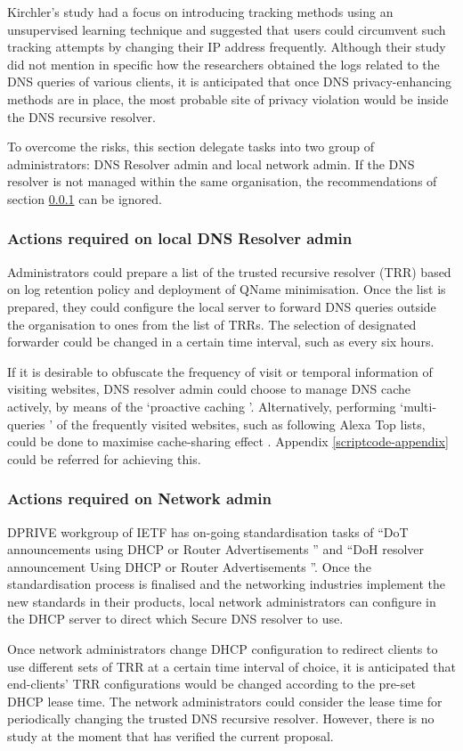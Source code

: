 Kirchler's study had a focus on introducing tracking methods using an unsupervised learning technique and suggested that users could circumvent such tracking attempts by changing their IP address frequently.
Although their study did not mention in specific how the researchers obtained the logs related to the DNS queries of various clients, it is anticipated that once DNS privacy-enhancing methods are in place, the most probable site of privacy violation would be inside the DNS recursive resolver.

To overcome the risks, this section delegate tasks into two group of administrators: DNS Resolver admin and local network admin.
If the DNS resolver is not managed within the same organisation, the recommendations of section \ref{dnsresolveradmin} can be ignored.

\subsubsection{Actions required on local DNS Resolver admin}\label{dnsresolveradmin}
Administrators could prepare a list of the trusted recursive resolver (TRR) based on log retention policy and deployment of QName minimisation.
Once the list is prepared, they could configure the local server to forward DNS queries outside the organisation to ones from the list of TRRs.
The selection of designated forwarder could be changed in a certain time interval, such as every six hours.

If it is desirable to obfuscate the frequency of visit or temporal information of visiting websites, DNS resolver admin could choose to manage DNS cache actively, by means of the `proactive caching \cite{cohen2003proactive}'. Alternatively, performing `multi-queries \cite{siby2018dns}' of the frequently visited websites, such as following Alexa Top lists, could be done to maximise cache-sharing effect \cite{wang2013analysis}. Appendix \ref{scriptcode-appendix} could be referred for achieving this.

\subsubsection{Actions required on Network admin}
DPRIVE workgroup of IETF has on-going standardisation tasks of ``DoT announcements using DHCP or Router Advertisements \cite{peterson-dot-dhcp-00}'' and ``DoH resolver announcement Using DHCP or Router Advertisements \cite{peterson-doh-dhcp-00}''.
Once the standardisation process is finalised and the networking industries implement the new standards in their products, local network administrators can configure in the DHCP server to direct which Secure DNS resolver to use.

Once network administrators change DHCP configuration to redirect clients to use different sets of TRR at a certain time interval of choice, it is anticipated that end-clients' TRR configurations would be changed according to the pre-set DHCP lease time. The network administrators could consider the lease time for periodically changing the trusted DNS recursive resolver. However, there is no study at the moment that has verified the current proposal.